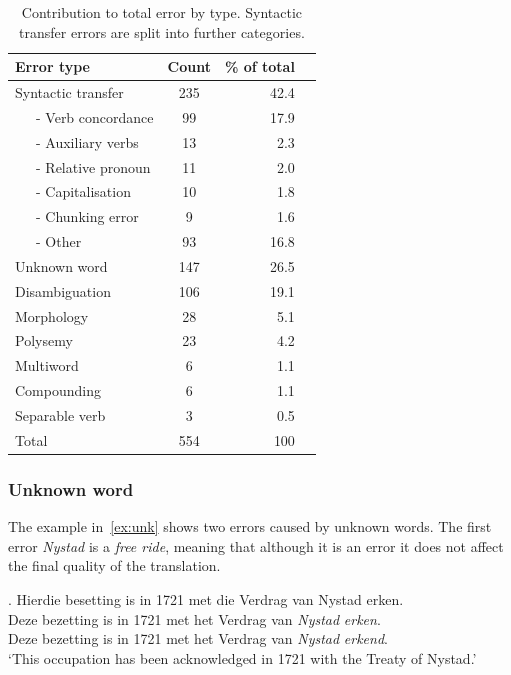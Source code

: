 \documentclass[11pt]{article}
\begin{document}
\begin{table}
  \begin{center}
  \begin{tabular}{|l|c|r|r|}
     \hline
     {\bf Error type}    & {\bf Count} & {\bf \% of total} \\
     \hline
     Syntactic transfer   & 235         & 42.4 \\
     \hline
     ~~~- Verb concordance & 99          & 17.9 \\
     ~~~- Auxiliary verbs & 13          & 2.3 \\ 
     ~~~- Relative pronoun& 11          & 2.0 \\
     ~~~- Capitalisation  & 10          & 1.8 \\
     ~~~- Chunking error  & 9           & 1.6 \\
     ~~~- Other           & 93          & 16.8 \\
     \hline
     Unknown word         & 147         & 26.5 \\
     Disambiguation       & 106         & 19.1 \\
     Morphology           & 28          & 5.1 \\
     Polysemy             & 23          & 4.2 \\
     Multiword            & 6           & 1.1 \\
     Compounding          & 6           & 1.1 \\
     Separable verb       & 3           & 0.5 \\
     \hline
     Total                & 554         & 100 \\
     \hline
  \end{tabular}
    \caption{Contribution to total error by type. Syntactic transfer errors are split into 
      further categories.}
    \label{table:qual}
  \end{center}
\end{table}

\subsubsection{Unknown word}

The example in~\ref{ex:unk} shows two errors caused by unknown words. The first error {\em Nystad} 
is a {\em free ride}, meaning that although it is an error it does not affect the final quality
of the translation. 

\ex. \label{ex:unk} 
    Hierdie besetting is in 1721 met die Verdrag van Nystad erken. \\
    Deze bezetting is in 1721 met het Verdrag van {\em *Nystad} {\em *erken}. \\
    Deze bezetting is in 1721 met het Verdrag van {\em Nystad} {\em erkend}. \\
    `This occupation has been acknowledged in 1721 with the Treaty of Nystad.'
\end{document}
